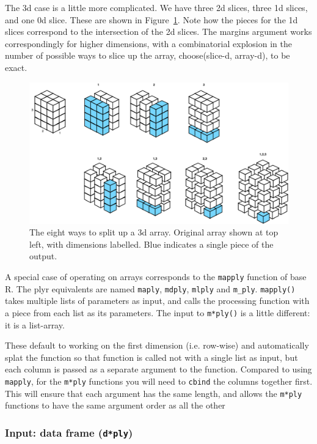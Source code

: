 \documentclass[letterpaper,oneside]{scrartcl}
\newcommand{\f}[1]{\lstinline!#1()!}
\begin{document}
The 3d case is a little more complicated.  We have three 2d slices, three 1d slices, and one 0d slice.  These are shown in Figure~\ref{fig:split-array}.  Note how the pieces for the 1d slices correspond to the intersection of the 2d slices.  The margins argument works correspondingly for higher dimensions, with a combinatorial explosion in the number of possible ways to slice up the array, choose(slice-d, array-d), to be exact.

\begin{figure}[htbp]
  \centering
    \includegraphics[width= \textwidth]{split-array}
  \caption{The eight ways to split up a 3d array.  Original array shown at top left, with dimensions labelled.  Blue indicates a single piece of the output.}
  \label{fig:split-array}
\end{figure}

A special case of operating on arrays corresponds to the {\tt mapply} function of base R.  The plyr equivalents are named {\tt maply}, {\tt mdply}, {\tt mlply} and {\tt m\_ply}.  \f{mapply} takes multiple lists of parameters as input, and calls the processing function with a piece from each list as its parameters.  The input to \f{m*ply} is a little different: it is a list-array.

These default to working on the first dimension (i.e. row-wise) and automatically splat the function so that function is called not with a single list as input, but each column is passed as a separate argument to the function.  Compared to using {\tt mapply}, for the {\tt m*ply} functions you will need to {\tt cbind} the columns together first.  This will ensure that each argument has the same length, and allows the {\tt m*ply} functions to have the same argument order as all the other 

\subsubsection{Input: data frame ({\tt d*ply})}
\end{document}
